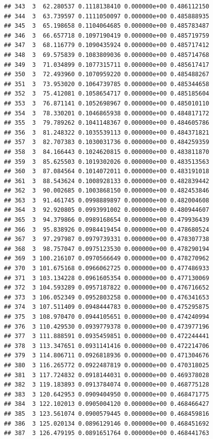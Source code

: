 \documentclass[article]{jss}\usepackage[]{graphicx}\usepackage[]{xcolor}
\makeatletter
\newenvironment{kframe}{%
 \def\at@end@of@kframe{}%
 \ifinner\ifhmode%
  \def\at@end@of@kframe{\end{minipage}}%
  \begin{minipage}{\columnwidth}%
 \fi\fi%
 \def\FrameCommand##1{\hskip\@totalleftmargin \hskip-\fboxsep
 \colorbox{shadecolor}{##1}\hskip-\fboxsep
     \hskip-\linewidth \hskip-\@totalleftmargin \hskip\columnwidth}%
 \MakeFramed {\advance\hsize-\width
   \@totalleftmargin\z@ \linewidth\hsize
   \@setminipage}}%
 {\par\unskip\endMakeFramed%
 \at@end@of@kframe}
\newenvironment{knitrout}{}{} %
\makeatother
\begin{document}
\begin{knitrout}
\begin{kframe}
\begin{verbatim}
## 343  3  62.280537 0.1118138410 0.000000e+00 0.486112150
## 344  3  63.739597 0.1111050097 0.000000e+00 0.485888935
## 345  3  65.198658 0.1104064685 0.000000e+00 0.485783487
## 346  3  66.657718 0.1097190419 0.000000e+00 0.485719759
## 347  3  68.116779 0.1090435924 0.000000e+00 0.485717412
## 348  3  69.575839 0.1083809036 0.000000e+00 0.485714768
## 349  3  71.034899 0.1077315711 0.000000e+00 0.485617417
## 350  3  72.493960 0.1070959220 0.000000e+00 0.485488267
## 351  3  73.953020 0.1064739785 0.000000e+00 0.485344658
## 352  3  75.412081 0.1058654717 0.000000e+00 0.485185604
## 353  3  76.871141 0.1052698967 0.000000e+00 0.485010110
## 354  3  78.330201 0.1046865938 0.000000e+00 0.484817172
## 355  3  79.789262 0.1041148367 0.000000e+00 0.484605786
## 356  3  81.248322 0.1035539113 0.000000e+00 0.484371821
## 357  3  82.707383 0.1030031736 0.000000e+00 0.484259359
## 358  3  84.166443 0.1024620815 0.000000e+00 0.483811870
## 359  3  85.625503 0.1019302026 0.000000e+00 0.483513563
## 360  3  87.084564 0.1014072011 0.000000e+00 0.483191018
## 361  3  88.543624 0.1008928133 0.000000e+00 0.482839442
## 362  3  90.002685 0.1003868150 0.000000e+00 0.482453846
## 363  3  91.461745 0.0998889897 0.000000e+00 0.482004608
## 364  3  92.920805 0.0993991002 0.000000e+00 0.480944607
## 365  3  94.379866 0.0989168654 0.000000e+00 0.479936439
## 366  3  95.838926 0.0984419454 0.000000e+00 0.478680524
## 367  3  97.297987 0.0979739331 0.000000e+00 0.478307738
## 368  3  98.757047 0.0975123530 0.000000e+00 0.478290194
## 369  3 100.216107 0.0970566649 0.000000e+00 0.478270962
## 370  3 101.675168 0.0966062725 0.000000e+00 0.477486933
## 371  3 103.134228 0.0961605354 0.000000e+00 0.477130069
## 372  3 104.593289 0.0957187822 0.000000e+00 0.476716652
## 373  3 106.052349 0.0952803258 0.000000e+00 0.476341653
## 374  3 107.511409 0.0948444783 0.000000e+00 0.475295875
## 375  3 108.970470 0.0944105651 0.000000e+00 0.474240994
## 376  3 110.429530 0.0939779378 0.000000e+00 0.473977196
## 377  3 111.888591 0.0935459851 0.000000e+00 0.472244441
## 378  3 113.347651 0.0931141416 0.000000e+00 0.472214706
## 379  3 114.806711 0.0926818936 0.000000e+00 0.471304676
## 380  3 116.265772 0.0922487819 0.000000e+00 0.470318025
## 381  3 117.724832 0.0918144031 0.000000e+00 0.469378028
## 382  3 119.183893 0.0913784074 0.000000e+00 0.468775128
## 383  3 120.642953 0.0909404950 0.000000e+00 0.468471775
## 384  3 122.102013 0.0905004120 0.000000e+00 0.468466427
## 385  3 123.561074 0.0900579445 0.000000e+00 0.468459816
## 386  3 125.020134 0.0896129146 0.000000e+00 0.468451692
## 387  3 126.479195 0.0891651764 0.000000e+00 0.468441763

\end{verbatim}
\end{kframe}
\end{knitrout}
\end{document}
